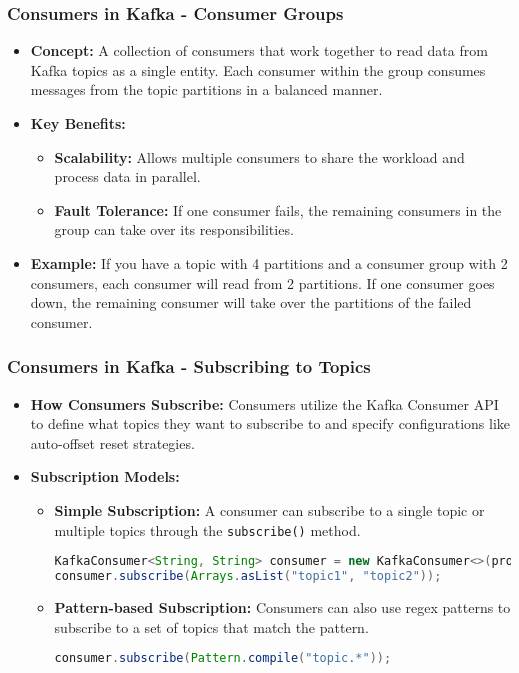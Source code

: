 \documentclass[aspectratio=169]{beamer}
\begin{document}
\begin{frame}[fragile]
    \frametitle{Consumers in Kafka - Consumer Groups}
    \begin{itemize}
        \item \textbf{Concept:}
        A collection of consumers that work together to read data from Kafka topics as a single entity. Each consumer within the group consumes messages from the topic partitions in a balanced manner.
        
        \item \textbf{Key Benefits:}
        \begin{itemize}
            \item \textbf{Scalability:} Allows multiple consumers to share the workload and process data in parallel.
            \item \textbf{Fault Tolerance:} If one consumer fails, the remaining consumers in the group can take over its responsibilities.
        \end{itemize}
        
        \item \textbf{Example:} 
        If you have a topic with 4 partitions and a consumer group with 2 consumers, each consumer will read from 2 partitions. If one consumer goes down, the remaining consumer will take over the partitions of the failed consumer.
    \end{itemize}
\end{frame}

\begin{frame}[fragile]
    \frametitle{Consumers in Kafka - Subscribing to Topics}
    \begin{itemize}
        \item \textbf{How Consumers Subscribe:}
        Consumers utilize the Kafka Consumer API to define what topics they want to subscribe to and specify configurations like auto-offset reset strategies.
        
        \item \textbf{Subscription Models:}
        \begin{itemize}
            \item \textbf{Simple Subscription:} A consumer can subscribe to a single topic or multiple topics through the \texttt{subscribe()} method.
            \begin{lstlisting}[language=Java]
KafkaConsumer<String, String> consumer = new KafkaConsumer<>(properties);
consumer.subscribe(Arrays.asList("topic1", "topic2"));
            \end{lstlisting}
            
            \item \textbf{Pattern-based Subscription:} Consumers can also use regex patterns to subscribe to a set of topics that match the pattern.
            \begin{lstlisting}[language=Java]
consumer.subscribe(Pattern.compile("topic.*"));
            \end{lstlisting}
        \end{itemize}
    \end{itemize}
\end{frame}
\end{document}

